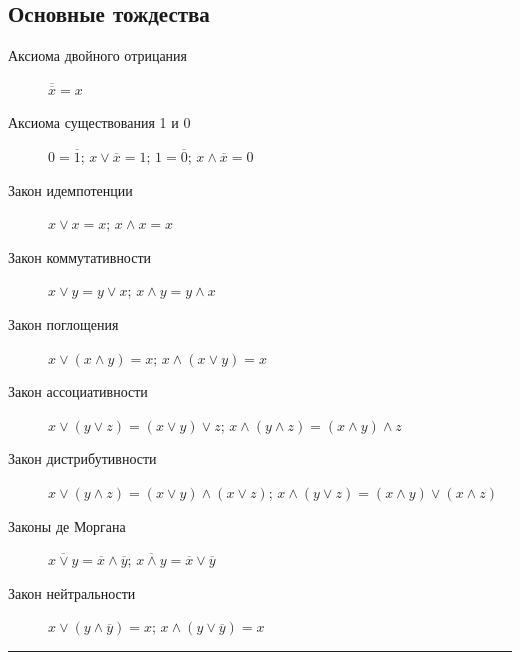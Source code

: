 \subsection{Основные тождества}\label{subsec:basic-identities}


\begin{description}
    \item [Аксиома двойного отрицания]
          $\overline{\overline{x}} = x$
    \item [Аксиома существования 1 и 0]
          $0 = \overline{1}$;
          $x \vee \overline{x} = 1$;
          $1 = \overline{0}$;
          $x \wedge \overline{x} = 0$
    \item [Закон идемпотенции]
          $x \vee x = x$;
          $x \wedge x = x$
    \item [Закон коммутативности]
          $x \vee y = y \vee x$;
          $x \wedge y = y \wedge x$
    \item [Закон поглощения]
          $x \vee (x \wedge y) = x$;
          $x \wedge (x \vee y) = x$
    \item [Закон ассоциативности]
          $x \vee (y \vee z) = (x \vee y) \vee z$;
          $x \wedge (y \wedge z) = (x \wedge y) \wedge z$
    \item [Закон дистрибутивности]
          $x \vee (y \wedge z) = (x \vee y) \wedge (x \vee z)$;
          $x \wedge (y \vee z) = (x \wedge y) \vee (x \wedge z)$
    \item [Законы де Моргана]
          $\overline{x \vee y} = \overline{x} \wedge \overline{y}$;
          $\overline{x \wedge y} = \overline{x} \vee \overline{y}$
    \item [Закон нейтральности]
          $x \vee (y \wedge \overline{y}) = x$;
          $x \wedge (y \vee \overline{y}) = x$
\end{description}

\bigskip\hrule\bigskip



